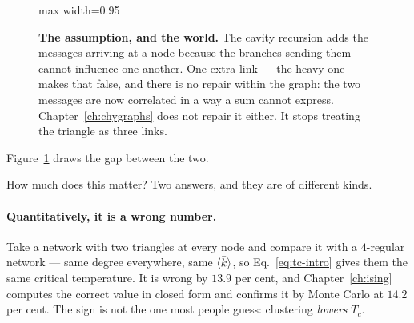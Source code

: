\begin{figure}[t]
\centering
\begin{adjustbox}{max width=0.95\linewidth}
\end{adjustbox}
\caption{\textbf{The assumption, and the world.} The cavity recursion adds the
messages arriving at a node because the branches sending them cannot influence
one another. One extra link --- the heavy one --- makes that false, and there is
no repair within the graph: the two messages are now correlated in a way a sum
cannot express. Chapter~\ref{ch:chygraphs} does not repair it either. It stops
treating the triangle as three links.}
\label{fig:treebreaks}
\end{figure}

Figure~\ref{fig:treebreaks} draws the gap between the two.

How much does this matter? Two answers, and they are of different kinds.

\paragraph{Quantitatively, it is a wrong number.} Take a network with two
triangles at every node and compare it with a $4$-regular network --- same
degree everywhere, same $\langle \bar k \rangle$, so Eq.~\eqref{eq:tc-intro} gives them the
same critical temperature. It is wrong by $13.9$ per cent, and
Chapter~\ref{ch:ising} computes the correct value in closed form and confirms it
by Monte Carlo at $14.2$ per cent. The sign is not the one most people guess:
clustering \emph{lowers} $T_{c}$.


